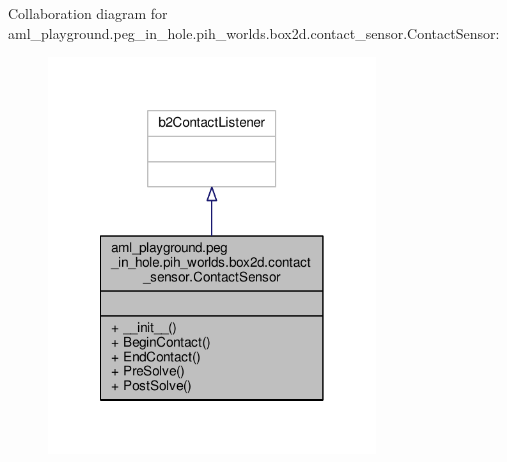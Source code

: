 Collaboration diagram for aml\-\_\-playground.\-peg\-\_\-in\-\_\-hole.\-pih\-\_\-worlds.\-box2d.\-contact\-\_\-sensor.\-Contact\-Sensor\-:\nopagebreak
\begin{figure}[H]
\begin{center}
\leavevmode
\includegraphics[width=246pt]{classaml__playground_1_1peg__in__hole_1_1pih__worlds_1_1box2d_1_1contact__sensor_1_1_contact_sensor__coll__graph}
\end{center}
\end{figure}
